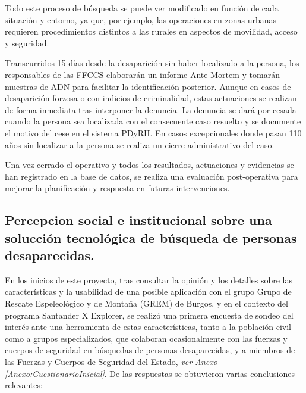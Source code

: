     Todo este proceso de búsqueda se puede ver modificado en función de cada situación y entorno, ya que, por ejemplo, las operaciones en zonas urbanas requieren procedimientos distintos a las rurales en aspectos de movilidad, acceso y seguridad.
        
    Transcurridos 15 días desde la desaparición sin haber localizado a la persona, los responsables de las FFCCS elaborarán un informe Ante Mortem y tomarán muestras de ADN para facilitar la identificación posterior. Aunque en casos de desaparición forzosa o con indicios de criminalidad, estas actuaciones se realizan de forma inmediata tras interponer la denuncia. La denuncia se dará por cesada cuando la persona sea localizada con el consecuente caso resuelto y se documente el motivo del cese en el sistema PDyRH. En casos excepcionales donde pasan 110 años sin localizar a la persona se realiza un cierre administrativo del caso.

    
        

    Una vez cerrado el operativo y todos los resultados, actuaciones y evidencias se han registrado en la base de datos, se realiza una evaluación post-operativa para mejorar la planificación y respuesta en futuras intervenciones.


    \subsection{Percepcion social e institucional sobre una solucción tecnológica de búsqueda de personas desaparecidas.}
    
    En los inicios de este proyecto, tras consultar la opinión y los detalles sobre las características y la usabilidad de una posible aplicación con el grupo Grupo de Rescate Espeleológico y de Montaña (GREM) de Burgos\cite{GREM}, y en el contexto del programa Santander X Explorer, se realizó una primera encuesta de sondeo del interés ante una herramienta de estas características, tanto a la población civil como a grupos especializados, que colaboran ocasionalmente con las fuerzas y cuerpos de seguridad en búsquedas de personas desaparecidas, y a miembros de las Fuerzas y Cuerpos de Seguridad del Estado, \textit{ver Anexo \ref{Anexo:CuestionarioInicial}}. De las respuestas se obtuvieron varias conclusiones relevantes:

